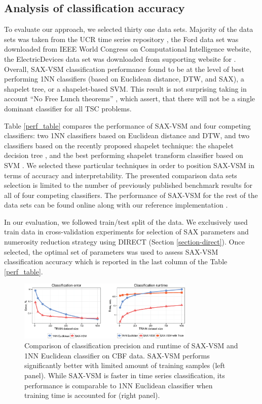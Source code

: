 \documentclass[conference]{IEEEtran}
\newcommand{\myfigureshrinkerless}{\vspace{-0.05cm}}
\begin{document}
\subsection{Analysis of classification accuracy}
To evaluate our approach, we selected thirty one data sets. Majority of the data sets was taken 
from the UCR time series repository \cite{ucr}, the Ford data set was downloaded from 
IEEE World Congress on Computational Intelligence \cite{ford} website, the 
ElectricDevices data set was downloaded from supporting website for \cite{bagnal}. 
Overall, SAX-VSM classification performance found to be at the level of best 
performing 1NN classifiers (based on Euclidean distance, DTW, and SAX), 
a shapelet tree, or a shapelet-based SVM. 
This result is not surprising taking in account ``No Free Lunch theorems'' \cite{nfl}, 
which assert, that there will not be a single dominant classifier for all TSC problems.

Table \ref{perf_table} compares the performance of SAX-VSM and four competing 
classifiers: two 1NN classifiers based on Euclidean distance and DTW, 
and two classifiers based on the recently proposed shapelet technique: 
the shapelet decision tree \cite{shapelet, logical}, and 
the best performing shapelet transform classifier based on SVM \cite{bagnal}. 
We selected these particular techniques in order to position SAX-VSM 
in terms of accuracy and interpretability. 
The presented comparison data sets selection is limited to the number 
of previously published benchmark results for all of four competing classifiers. 
The performance of SAX-VSM for the rest of the data sets can be found online 
along with our reference implementation \cite{jmotif}.

In our evaluation, we followed train/test split of the data. We exclusively used train data in 
cross-validation experiments for selection of SAX parameters and numerosity reduction strategy
using DIRECT (Section \ref{section-direct}). Once selected, the optimal set of parameters 
was used to assess SAX-VSM classification accuracy which is reported in the last column 
of the Table \ref{perf_table}.

\begin{figure}[t]
   \myfigureshrinkerless
   \centering
   \includegraphics[width=84mm]{figures/precision-runtime.eps}
   \caption{Comparison of classification precision and runtime of SAX-VSM and 1NN 
   Euclidean classifier on CBF data. SAX-VSM performs significantly better with limited 
   amount of training samples (left panel). While SAX-VSM is faster in time series 
   classification, its performance is comparable to 1NN Euclidean classifier when 
   training time is accounted for (right panel).}
   \label{fig:precision-runtime}
\end{figure}
\end{document}
